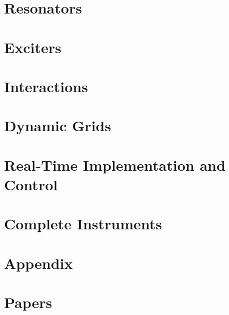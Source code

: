 \part{Resonators}\label{part:resonators}


\part{Exciters}\label{part:exciters}


\part{Interactions}\label{part:interactions}


\part{Dynamic Grids}\label{part:dynamic}


\part{Real-Time Implementation and Control}\label{part:realtime}


\part{Complete Instruments}\label{part:instrument}


\pagebreak

\printbibliography[notkeyword=main, notkeyword=other]
\appendix
\part{Appendix}


\renewcommand\appendixname{Paper} 
\setcounter{chapter}{0} %
\part{Papers}\label{prt:papers}


\titleformat{%
  \chapter
}[%
display%
]{%
  \normalfont\huge 
}{%
  \begin{center}\color{aaublue}\chaptertitlename\ \thechapter\end{center}
}{%
  1cm
}{%
  \thispagestyle{empty}\begin{center}\Large
[%
]
  \end{center}}


